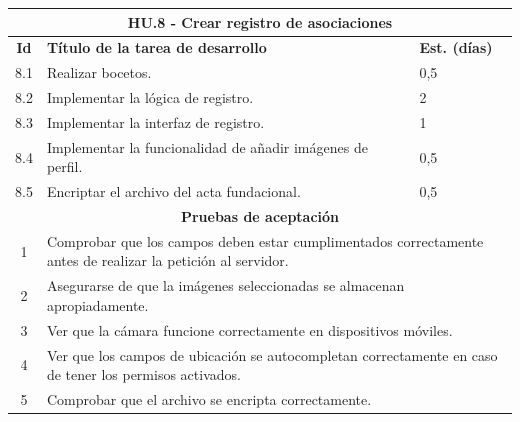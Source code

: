 \begin{table}[H]
	\centering
\begin{tabular}{|c|p{9.5cm}|p{1cm}|}
	\hline
	\multicolumn{3}{|c|}{\textbf{HU.8 - Crear registro de asociaciones}} \\
	\hline
	\textbf{Id} & \textbf{Título de la tarea de desarrollo} & \textbf{Est. (días)} \\
	\hline
	8.1 & Realizar bocetos. & 0,5 \\ \hline
	8.2 &  Implementar la lógica de registro. & 2 \\ \hline
	8.3 &  Implementar la interfaz de registro. & 1 \\ \hline
	8.4 &  Implementar la funcionalidad de añadir imágenes de perfil. & 0,5 \\ \hline
	8.5 &  Encriptar el archivo del acta fundacional. & 0,5 \\ \hline
	
	\multicolumn{3}{|c|}{\textbf{Pruebas de aceptación}} \\ \hline
	1 & \multicolumn{2}{|p{10cm}|}{Comprobar que los campos deben estar cumplimentados correctamente antes de realizar la petición al servidor.} \\ \hline
	2 & \multicolumn{2}{|p{10cm}|}{Asegurarse de que la imágenes seleccionadas se almacenan apropiadamente.} \\ \hline
	3 & \multicolumn{2}{|p{10cm}|}{Ver que la cámara funcione correctamente en dispositivos móviles.} \\ \hline
	4 & \multicolumn{2}{|p{10cm}|}{Ver que los campos de ubicación se autocompletan correctamente en caso de tener los permisos activados.} \\ \hline
	5 & \multicolumn{2}{|p{10cm}|}{Comprobar que el archivo se encripta correctamente.} \\ \hline
	
\end{tabular}
\end{table}


